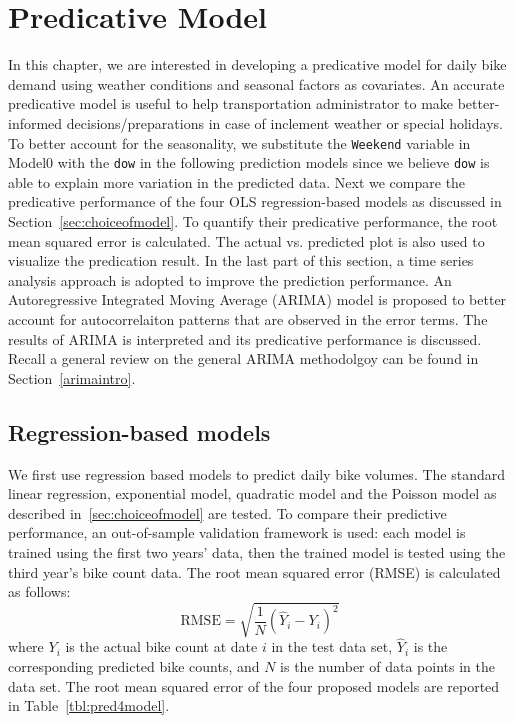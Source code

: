 \documentclass [11pt, proquest] {uwthesis}[2015/03/03]
\begin{document}


\chapter{Predicative Model}

In this chapter, we are interested in developing a predicative model for daily bike demand using weather conditions and seasonal factors as covariates. An accurate predicative model is useful to help transportation administrator to make better-informed decisions/preparations in case of inclement weather or special holidays. To better account for the seasonality, we substitute the \texttt{Weekend} variable in Model0 with the \texttt{dow} in the following prediction models since we believe \texttt{dow} is able to explain more variation in the predicted data. Next we compare the predicative performance of the four OLS regression-based models as discussed in Section~\ref{sec:choiceofmodel}. To quantify their predicative performance, the root mean squared error is calculated. The actual vs. predicted plot is also used to visualize the predication result. In the last part of this section, a time series analysis approach is adopted to improve the prediction performance. An Autoregressive Integrated Moving Average (ARIMA) model is proposed to better account for autocorrelaiton patterns that are observed in the error terms. The results of ARIMA is interpreted and its predicative performance is discussed. Recall a general review on the general ARIMA methodolgoy can be found in Section~\ref{arimaintro}.

\section{Regression-based models}
We first use regression based models to predict daily bike volumes. The standard linear regression, exponential model, quadratic model and the Poisson model as described in~\ref{sec:choiceofmodel} are tested. To compare their predictive performance, an out-of-sample validation framework is used: each model is trained using the first two years' data, then the trained model is tested using the third year's bike count data. The root mean squared error (RMSE) is calculated as follows:
\begin{equation*}
\text{RMSE} = \sqrt{\frac{1}{N}(\hat{Y}_i - Y_i)^2}
\end{equation*}
where $Y_i$ is the actual bike count at date $i$ in the test data set, $\hat{Y}_i$ is the corresponding predicted bike counts, and $N$ is the number of data points in the data set. The root mean squared error of the four proposed models are reported in Table~\ref{tbl:pred4model}.
\end{document}
